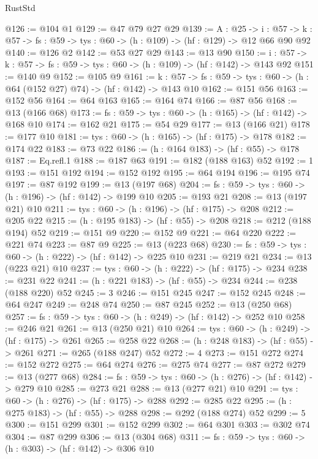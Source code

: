 \begin{lexlean}{RustStd}
\begin{coremodule}
{\begin{coremodule}
{{{{{{{{{{{{{{{{{{{{@126 := @104 @1
@129 := @47 @79 @27 @29
@139 := {A : @25} ->
  {i : @57} ->
  {k : @57} -> {fs : @59} -> {tys : @60} -> (h : @109) -> (hf : @129) -> @12 @66 @90 @92
@140 := @126 @2
@142 := @53 @27 @29
@143 := @13 @90
@150 := {i : @57} -> {k : @57} -> {fs : @59} -> {tys : @60} -> (h : @109) -> (hf : @142) -> @143 @92
@151 := @140 @9
@152 := @105 @9
@161 := {k : @57} ->
  {fs : @59} -> {tys : @60} -> (h : @64 (@152 @27) @74) -> (hf : @142) -> @143 @10
@162 := @151 @56
@163 := @152 @56
@164 := @64 @163
@165 := @164 @74
@166 := @87 @56
@168 := @13 (@166 @68)
@173 := {fs : @59} -> {tys : @60} -> (h : @165) -> (hf : @142) -> @168 @10
@174 := @162 @21
@175 := @54 @29
@177 := @13 (@166 @21)
@178 := @177 @10
@181 := {tys : @60} -> (h : @165) -> (hf : @175) -> @178
@182 := @174 @22
@183 := @73 @22
@186 := (h : @164 @183) -> (hf : @55) -> @178
@187 := Eq.refl.{1}
@188 := @187 @63
@191 := @182 (@188 @163) @52
@192 := 1
@193 := @151 @192
@194 := @152 @192
@195 := @64 @194
@196 := @195 @74
@197 := @87 @192
@199 := @13 (@197 @68)
@204 := {fs : @59} -> {tys : @60} -> (h : @196) -> (hf : @142) -> @199 @10
@205 := @193 @21
@208 := @13 (@197 @21) @10
@211 := {tys : @60} -> (h : @196) -> (hf : @175) -> @208
@212 := @205 @22
@215 := (h : @195 @183) -> (hf : @55) -> @208
@218 := @212 (@188 @194) @52
@219 := @151 @9
@220 := @152 @9
@221 := @64 @220
@222 := @221 @74
@223 := @87 @9
@225 := @13 (@223 @68)
@230 := {fs : @59} -> {tys : @60} -> (h : @222) -> (hf : @142) -> @225 @10
@231 := @219 @21
@234 := @13 (@223 @21) @10
@237 := {tys : @60} -> (h : @222) -> (hf : @175) -> @234
@238 := @231 @22
@241 := (h : @221 @183) -> (hf : @55) -> @234
@244 := @238 (@188 @220) @52
@245 := 3
@246 := @151 @245
@247 := @152 @245
@248 := @64 @247
@249 := @248 @74
@250 := @87 @245
@252 := @13 (@250 @68)
@257 := {fs : @59} -> {tys : @60} -> (h : @249) -> (hf : @142) -> @252 @10
@258 := @246 @21
@261 := @13 (@250 @21) @10
@264 := {tys : @60} -> (h : @249) -> (hf : @175) -> @261
@265 := @258 @22
@268 := (h : @248 @183) -> (hf : @55) -> @261
@271 := @265 (@188 @247) @52
@272 := 4
@273 := @151 @272
@274 := @152 @272
@275 := @64 @274
@276 := @275 @74
@277 := @87 @272
@279 := @13 (@277 @68)
@284 := {fs : @59} -> {tys : @60} -> (h : @276) -> (hf : @142) -> @279 @10
@285 := @273 @21
@288 := @13 (@277 @21) @10
@291 := {tys : @60} -> (h : @276) -> (hf : @175) -> @288
@292 := @285 @22
@295 := (h : @275 @183) -> (hf : @55) -> @288
@298 := @292 (@188 @274) @52
@299 := 5
@300 := @151 @299
@301 := @152 @299
@302 := @64 @301
@303 := @302 @74
@304 := @87 @299
@306 := @13 (@304 @68)
@311 := {fs : @59} -> {tys : @60} -> (h : @303) -> (hf : @142) -> @306 @10
}}}}}}}}}}}}}}}}}}}}
\end{coremodule}}
\end{coremodule}
\end{lexlean}
